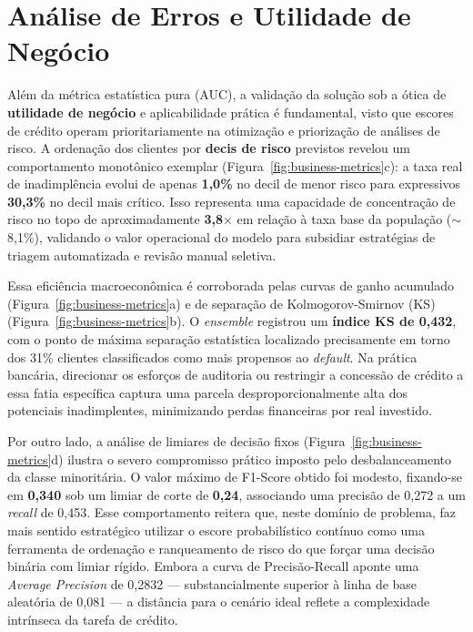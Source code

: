 \documentclass[10pt,a4paper]{article}
\begin{document}
\section{Análise de Erros e Utilidade de Negócio}
Além da métrica estatística pura (AUC), a validação da solução sob a ótica de \textbf{utilidade de negócio} e aplicabilidade prática é fundamental, visto que escores de crédito operam prioritariamente na otimização e priorização de análises de risco. A ordenação dos clientes por \textbf{decis de risco} previstos revelou um comportamento monotônico exemplar (Figura~\ref{fig:business-metrics}c): a taxa real de inadimplência evolui de apenas \textbf{1,0\%} no decil de menor risco para expressivos \textbf{30,3\%} no decil mais crítico. Isso representa uma capacidade de concentração de risco no topo de aproximadamente \textbf{3,8$\times$} em relação à taxa base da população ($\sim$8,1\%), validando o valor operacional do modelo para subsidiar estratégias de triagem automatizada e revisão manual seletiva.

Essa eficiência macroeconômica é corroborada pelas curvas de ganho acumulado (Figura~\ref{fig:business-metrics}a) e de separação de Kolmogorov-Smirnov (KS) (Figura~\ref{fig:business-metrics}b). O \textit{ensemble} registrou um \textbf{índice KS de 0,432}, com o ponto de máxima separação estatística localizado precisamente em torno dos 31\% clientes classificados como mais propensos ao \textit{default}. Na prática bancária, direcionar os esforços de auditoria ou restringir a concessão de crédito a essa fatia específica captura uma parcela desproporcionalmente alta dos potenciais inadimplentes, minimizando perdas financeiras por real investido.

Por outro lado, a análise de limiares de decisão fixos (Figura~\ref{fig:business-metrics}d) ilustra o severo compromisso prático imposto pelo desbalanceamento da classe minoritária. O valor máximo de F1-Score obtido foi modesto, fixando-se em \textbf{0,340} sob um limiar de corte de \textbf{0,24}, associando uma precisão de 0,272 a um \textit{recall} de 0,453. Esse comportamento reitera que, neste domínio de problema, faz mais sentido estratégico utilizar o escore probabilístico contínuo como uma ferramenta de ordenação e ranqueamento de risco do que forçar uma decisão binária com limiar rígido. Embora a curva de Precisão-Recall aponte uma \textit{Average Precision} de 0,2832 --- substancialmente superior à linha de base aleatória de 0,081 --- a distância para o cenário ideal reflete a complexidade intrínseca da tarefa de crédito.
\end{document}
